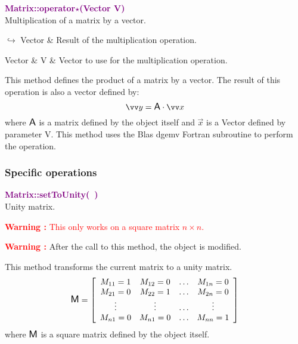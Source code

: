 \textcolor{purple}{\textbf{Matrix::operator$\star$(Vector V)}}\label{Matrix::operator*(Vector V)}\\
Multiplication of a matrix by a vector.\vspace*{-0.5em}
\begin{tcolorbox}[grow to left by=-1cm, width=\textwidth-1cm,myArgs,tabularx={l|R}]
$\hookrightarrow$ Vector & Result of the multiplication operation.
\end{tcolorbox}

\begin{tcolorbox}[width=\textwidth,myArgs,tabularx={ll|R}]
Vector & V & Vector to use for the multiplication operation.
\end{tcolorbox}

This method defines the product of a matrix by a vector.
The result of this operation is also a vector defined by:
\begin{equation*}
\overrightarrow{y} = \A \cdot \overrightarrow{x}
\end{equation*}
where $\mbox{\large\ensuremath{\mathsf{A}}}$ is a matrix defined by the object itself and $\overrightarrow{x}$ is a Vector defined by parameter V.
This method uses the Blas \textsf{dgemv} Fortran subroutine to perform the operation.

\subsubsection{Specific operations}

\textcolor{purple}{\textbf{Matrix::setToUnity(~)}}\label{Matrix::setToUnity()}\\
Unity matrix.

\hspace*{10mm}\textcolor{red}{\textbf{Warning :} This only works on a square matrix $n \times n$.}

\hspace*{10mm}\textcolor{red}{\textbf{Warning :}} After the call to this method, the object is modified.

This method transforms the current matrix to a unity matrix.
\begin{equation*}
\mbox{\large\ensuremath{\mathsf{M}}}=\left[\begin{array}{cccc}
  M_{11}=1 & M_{12}=0 & \hdots & M_{1n}=0\\
  M_{21}=0 & M_{22}=1 & \hdots & M_{2n}=0\\
  \vdots & \vdots & \hdots & \vdots\\
  M_{n1}=0 & M_{n1}=0 & \hdots & M_{nn}=1
  \end{array}\right]
\end{equation*}
where $\mbox{\large\ensuremath{\mathsf{M}}}$ is a square matrix defined by the object itself.

